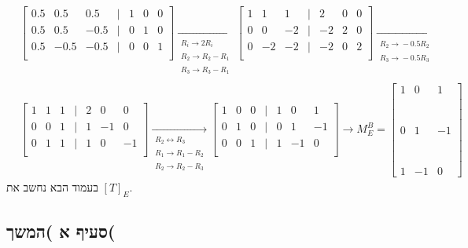 \documentclass[11pt, oneside]{article}
\newcommand{\br}{\\\\\\\\\\\\\\}
\newcommand{\opr}[1]{\xrightarrow[\text{#1}]{}}
\newcommand{\oprm}[1]{\underset{\substack{#1}}{\longrightarrow}}
\newcommand{\bidiarrow}[1]{\underset{\text{#1}}{\leftrightarrow}}
\begin{document}
\begin{align*}
& \begin{bmatrix}
0.5 & 0.5 & 0.5 & \mid & 1 & 0 & 0\\
0.5 & 0.5 & -0.5 & \mid & 0 & 1 & 0\\
0.5 & -0.5 & -0.5 & \mid & 0 & 0 & 1\\
\end{bmatrix}
\oprm{%
R_i \opr{} 2R_i\\
R_2 \opr{} R_2 - R_1\\
R_3 \opr{} R_3 - R_1
}
\begin{bmatrix}
1 & 1 & 1 & \mid & 2 & 0 & 0\\
0 & 0 & -2 & \mid & -2 & 2 & 0\\
0 & -2 & -2 & \mid & -2 & 0 & 2\\
\end{bmatrix}
\oprm{%
R_2 \opr{} -0.5R_2\\
R_3 \opr{} -0.5R_3\\
}\\
& \begin{bmatrix}
1 & 1 & 1 & \mid & 2 & 0 & 0\\
0 & 0 & 1 & \mid & 1 & -1 & 0\\
0 & 1 & 1 & \mid & 1 & 0 & -1\\
\end{bmatrix}
\oprm{%
R_2 \bidiarrow{} R_3\\
R_1 \opr{} R_1 - R_2\\
R_2 \opr{} R_2 - R_3
}
\begin{bmatrix}
1 & 0 & 0 & \mid & 1 & 0 & 1\\
0 & 1 & 0 & \mid & 0 & 1 & -1\\
0 & 0 & 1 & \mid & 1 & -1 & 0\\
\end{bmatrix}
\opr{}
M^{B}_{E} = \begin{bmatrix}
1 & 0 & 1\br
0 & 1 & -1\br
1 & -1 & 0
\end{bmatrix}
\end{align*}
בעמוד הבא נחשב את $[T]_E$.
\clearpage
\setcounter{subsection}{0}
\subsection{סעיף א )המשך(}

\end{document}
